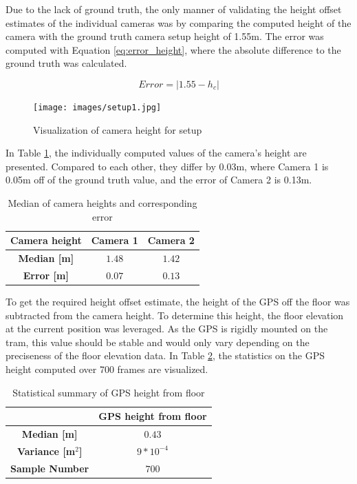Due to the lack of ground truth, the only manner of validating the height offset estimates of the individual cameras was by comparing the computed height of the camera with the ground truth camera setup height of 1.55m. The error was computed with Equation \ref{eq:error_height}, where the absolute difference to the ground truth was calculated.

 \begin{equation}
Error = |1.55 - h_c|
\label{eq:error_height}
\end{equation}

\begin{figure}[h!]
   \centering
   \texttt{[image: images/setup1.jpg]}
   \caption{Visualization of camera height for setup}
   \label{pics:setup3}
\end{figure}

In Table \ref{tab:y}, the individually computed values of the camera's height are presented. Compared to each other, they differ by 0.03m, where Camera 1 is 0.05m off of the ground truth value, and the error of Camera 2 is 0.13m.\\

\begin{table}[h!]
\centering
\begin{tabular}{c c c}
\textbf{Camera height}  & \textbf{Camera 1} & \textbf{Camera 2} \\
\midrule
\textbf{Median [m]} & $1.48$ & $1.42$ \\
\textbf{Error [m]} & $0.07$ & $0.13$ \\
\bottomrule
\end{tabular}
\caption{Median of camera heights and corresponding error}
\label{tab:y}
\end{table}

 \newpage
To get the required height offset estimate, the height of the GPS off the floor was subtracted from the camera height. To determine this height, the floor elevation at the current position was leveraged. As the GPS is rigidly mounted on the tram, this value should be stable and would only vary depending on the preciseness of the floor elevation data. In Table \ref{tab:gpsheight}, the statistics on the GPS height computed over 700 frames are visualized.

\begin{table}[h]
\centering
\begin{tabular}{cc}
\textbf{} & \textbf{GPS height from floor} \\
\midrule
\textbf{Median [m]} & $0.43 $ \\
\textbf{Variance [m$^2$]} & $9 * 10^{-4} $\\
\textbf{Sample Number} & $700$\\
\bottomrule
\end{tabular}
\caption{Statistical summary of GPS height from floor}
\label{tab:gpsheight}
\end{table}
\newpage






